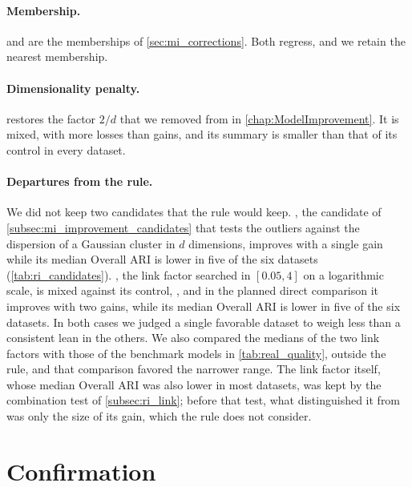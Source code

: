 \paragraph{Membership.}  and  are the memberships of \cref{sec:mi_corrections}. Both regress, and we retain the nearest membership.

\paragraph{Dimensionality penalty.}  restores the factor $2/d$ that we removed from \MicroTEDAClusPlus in \cref{chap:ModelImprovement}. It is mixed, with more losses than gains, and its summary is smaller than that of its control in every dataset.

\paragraph{Departures from the rule.} We did not keep two candidates that the rule would keep. , the candidate of \cref{subsec:mi_improvement_candidates} that tests the outliers against the dispersion of a Gaussian cluster in $d$ dimensions, improves  with a single gain while its median Overall ARI is lower in five of the six datasets (\cref{tab:ri_candidates}). , the link factor searched in $[0.05, 4]$ on a logarithmic scale, is mixed against its control, , and in the planned direct comparison it improves  with two gains, while its median Overall ARI is lower in five of the six datasets. In both cases we judged a single favorable dataset to weigh less than a consistent lean in the others. We also compared the medians of the two link factors with those of the benchmark models in \cref{tab:real_quality}, outside the rule, and that comparison favored the narrower range. The link factor itself, whose median Overall ARI was also lower in most datasets, was kept by the combination test of \cref{subsec:ri_link}; before that test, what distinguished it from  was only the size of its gain, which the rule does not consider.

\section{Confirmation}
\label{sec:ri_confirmation}

